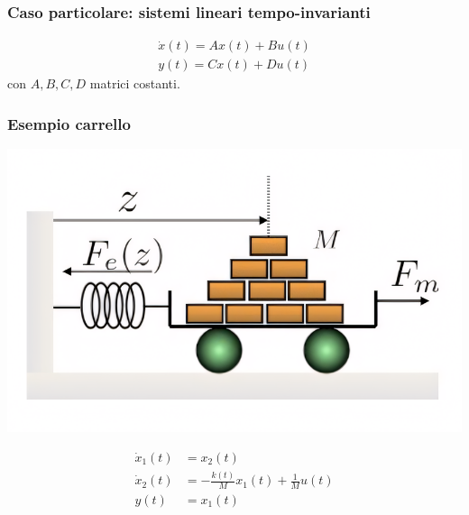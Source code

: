 \documentclass{article}
\begin{document}
\subsubsection{Caso particolare: sistemi lineari tempo-invarianti}
\begin{align*}
    \dot x(t) = A x(t) + B u(t)\\
    y(t) = C x(t) + D u(t)
\end{align*}
con $A,B,C,D$ matrici costanti.


\subsubsection{Esempio carrello}
\begin{center}
    \includegraphics[scale=0.2]{Images/Es_carrello.png}
\end{center}
\begin{align*}
    \dot x_1(t) &= x_2(t)\\
    \dot x_2(t) &= - \frac{k(t)}{M}x_1(t) + \frac{1}{M} u(t)\\
    y(t) &= x_1(t)
\end{align*}
\end{document}
